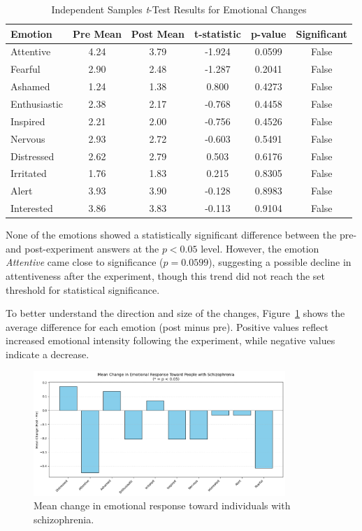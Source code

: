 \begin{table}[H]
\centering
\caption{Independent Samples \textit{t}-Test Results for Emotional Changes}
\begin{tabular}{|l|c|c|c|c|c|}
\hline
\textbf{Emotion} & \textbf{Pre Mean} & \textbf{Post Mean} & \textbf{t-statistic} & \textbf{p-value} & \textbf{Significant} \\
\hline
Attentive     & 4.24 & 3.79 & -1.924 & 0.0599 & False \\
Fearful       & 2.90 & 2.48 & -1.287 & 0.2041 & False \\
Ashamed       & 1.24 & 1.38 &  0.800 & 0.4273 & False \\
Enthusiastic  & 2.38 & 2.17 & -0.768 & 0.4458 & False \\
Inspired      & 2.21 & 2.00 & -0.756 & 0.4526 & False \\
Nervous       & 2.93 & 2.72 & -0.603 & 0.5491 & False \\
Distressed    & 2.62 & 2.79 &  0.503 & 0.6176 & False \\
Irritated     & 1.76 & 1.83 &  0.215 & 0.8305 & False \\
Alert         & 3.93 & 3.90 & -0.128 & 0.8983 & False \\
Interested    & 3.86 & 3.83 & -0.113 & 0.9104 & False \\
\hline
\end{tabular}
\label{tab:ttest_emotions}
\end{table}

None of the emotions showed a statistically significant difference between the pre- and post-experiment answers at the $p < 0.05$ level. However, the emotion \textit{Attentive} came close to significance ($p = 0.0599$), suggesting a possible decline in attentiveness after the experiment, though this trend did not reach the set threshold for statistical significance.

\vspace{1em}

To better understand the direction and size of the changes, Figure~\ref{fig:emotion_change} shows the average difference for each emotion (post minus pre). Positive values reflect increased emotional intensity following the experiment, while negative values indicate a decrease.


\begin{figure}[H]
    \centering
    \includegraphics[width=0.85\textwidth]{../../Figures/mean-change-emotions.png}
    \caption{Mean change in emotional response toward individuals with schizophrenia.}
    \label{fig:emotion_change}
\end{figure}


